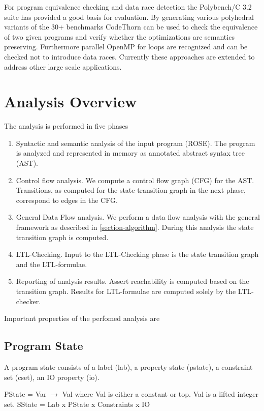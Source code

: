 \documentclass[natbib]{article}
\begin{document}
{For program equivalence checking and data race detection the
Polybench/C 3.2 suite has provided a good basis for evaluation. By
generating various polyhedral variants of the 30+ benchmarks CodeThorn
can be used to check the equivalence of two given programs and verify
whether the optimizations are semantics preserving. Furthermore
parallel OpenMP for loops are recognized and can be checked not to
introduce data races. Currently these approaches are extended to
address other large scale applications.

\section{Analysis Overview}

The analysis is performed in five phases

\begin{enumerate}
\item Syntactic and semantic analysis of the input program (ROSE). The program is analyzed and represented in memory as annotated abstract syntax tree (AST).
\item Control flow analysis. We compute a control flow graph (CFG) for the AST. Transitions, as computed for the state transition graph in the next phase, correspond to edges in the CFG.
\item General Data Flow analysis. We perform a data flow analysis with the general framework as described in \ref{section-algorithm}. During this analysis the state transition graph is computed.
\item LTL-Checking. Input to the LTL-Checking phase is the state transition graph and the LTL-formulae.
\item Reporting of analysis results. Assert reachability is computed based on the transition graph. Results for LTL-formulae are computed solely by the LTL-checker.
\end{enumerate}

Important properties of the perfomed analysis are

\subsection{Program State}

A program state consists of a label (lab), a property state (pstate), a constraint set (cset), an IO property (io).

PState = Var $\rightarrow$ Val where Val is either a constant or top. Val is a lifted integer set.
SState = Lab x PState x Constraints x IO

}
\end{document}
